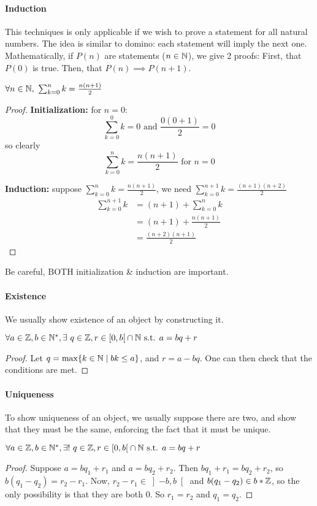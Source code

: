\paragraph{Induction}
This techniques is only applicable if we wish to prove a statement for all natural numbers.
The idea is similar to domino: each statement will imply the next one.
Mathematically, if $P(n)$ are statements ($n \in \mathbb{N}$), we give 2 proofs:
First, that $P(0)$ is true.
Then, that $P(n) \implies P(n+1)$.
\begin{property}
    $\forall n \in \mathbb{N}, \ \sum_{k=0}^{n} k = \frac{n(n+1)}{2}$
\end{property}
\begin{proof}
    \textbf{Initialization:} for $n=0$:\\
    $$\sum_{k=0}^{0} k = 0 \text{ and } \frac{0(0+1)}{2}=0$$
    so clearly $$\sum_{k=0}^{n} k = \frac{n(n+1)}{2} \text{ for } n=0$$
    
    \textbf{Induction:} suppose $\sum_{k=0}^{n} k = \frac{n(n+1)}{2}$, we need $\sum_{k=0}^{n+1} k = \frac{(n+1)(n+2)}{2}$\\
    \begin{align*}
            \sum_{k=0}^{n+1} k &= (n+1) + \sum_{k=0}^{n} k\\
                               &= (n+1) + \frac{n(n+1)}{2}\\
                               &= \frac{(n+2)(n+1)}{2}
    \end{align*}
\end{proof}
Be careful, BOTH initialization \& induction are important.
\paragraph{Existence}
We usually show existence of an object by constructing it.
\begin{property}
    $\forall a \in \mathbb{Z}, b \in \mathbb{N}^*, \exists \ q \in \mathbb{Z}, r \in \left[ 0, b \right[ \cap \mathbb{N} \text{ s.t. } a=bq+r$
\end{property}
\begin{proof}
    Let $q = \max\{ k \in \mathbb{N} \mid bk \leq a \}$, and $r = a-bq$.
    One can then check that the conditions are met.
\end{proof}
\paragraph{Uniqueness}
To show uniqueness of an object, we usually suppose there are two, and show that they must be the same, enforcing the fact that it must be unique.
\begin{property}
    $\forall a \in \Z, b \in \N^*, \exists ! \ q \in \Z, r \in \left[ 0, b \right[ \cap \N \text{ s.t. } a=bq+r$
\end{property}
\begin{proof}
    Suppose $a=bq_1+r_1$ and $a=bq_2+r_2$.
    Then $bq_1+r_1=bq_2+r_2$, so $b(q_1-q_2)=r_2-r_1$.
    Now, $r_2-r_1 \in \left] -b,b \right[$ and $b(q_1-q_2) \in b*\mathbb{Z}$, so the only possibility is that they are both $0$.
    So $r_1=r_2$ and $q_1=q_2$.
\end{proof}

